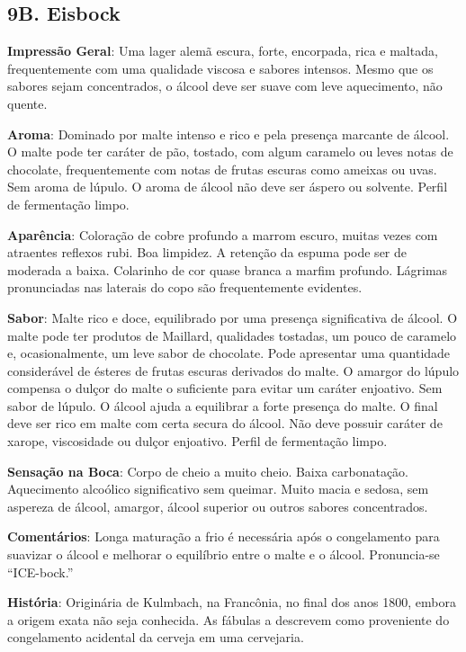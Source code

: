 \subsection*{9B. Eisbock}
\textbf{Impressão Geral}: Uma lager alemã escura, forte, encorpada, rica e maltada, frequentemente com uma qualidade viscosa e sabores intensos. Mesmo que os sabores sejam concentrados, o álcool deve ser suave com leve aquecimento, não quente.

\textbf{Aroma}: Dominado por malte intenso e rico e pela presença marcante de álcool. O malte pode ter caráter de pão, tostado, com algum caramelo ou leves notas de chocolate, frequentemente com notas de frutas escuras como ameixas ou uvas. Sem aroma de lúpulo. O aroma de álcool não deve ser áspero ou solvente. Perfil de fermentação limpo.

\textbf{Aparência}: Coloração de cobre profundo a marrom escuro, muitas vezes com atraentes reflexos rubi. Boa limpidez. A retenção da espuma pode ser de moderada a baixa. Colarinho de cor quase branca a marfim profundo. Lágrimas pronunciadas nas laterais do copo são frequentemente evidentes.

\textbf{Sabor}: Malte rico e doce, equilibrado por uma presença significativa de álcool. O malte pode ter produtos de Maillard, qualidades tostadas, um pouco de caramelo e, ocasionalmente, um leve sabor de chocolate. Pode apresentar uma quantidade considerável de ésteres de frutas escuras derivados do malte. O amargor do lúpulo compensa o dulçor do malte o suficiente para evitar um caráter enjoativo. Sem sabor de lúpulo. O álcool ajuda a equilibrar a forte presença do malte. O final deve ser rico em malte com certa secura do álcool. Não deve possuir caráter de xarope, viscosidade ou dulçor enjoativo. Perfil de fermentação limpo.

\textbf{Sensação na Boca}: Corpo de cheio a muito cheio. Baixa carbonatação. Aquecimento alcoólico significativo sem queimar. Muito macia e sedosa, sem aspereza de álcool, amargor, álcool superior ou outros sabores concentrados.

\textbf{Comentários}: Longa maturação a frio é necessária após o congelamento para suavizar o álcool e melhorar o equilíbrio entre o malte e o álcool. Pronuncia-se “ICE-bock.”

\textbf{História}: Originária de Kulmbach, na Francônia, no final dos anos 1800, embora a origem exata não seja conhecida. As fábulas a descrevem como proveniente do congelamento acidental da cerveja em uma cervejaria.

